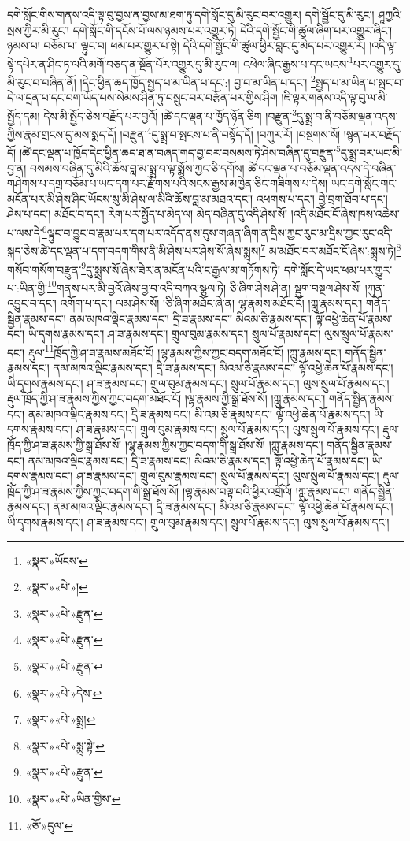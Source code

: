 དགེ་སློང་གིས་གནས་འདི་ལྟ་བུ་བྱས་ན་བྱས་མ་ཐག་ཏུ་དགེ་སློང་དུ་མི་རུང་བར་འགྱུར། དགེ་སྦྱོང་དུ་མི་རུང་། ཤཱཀྱའི་སྲས་ཀྱིར་མི་རུང་། དགེ་སློང་གི་དངོས་པོ་ལས་ཉམས་པར་འགྱུར་ཏེ། དེའི་དགེ་སྦྱོང་གི་ཚུལ་ཞིག་པར་འགྱུར་ཞིང་། ཉམས་པ། བཅོམ་པ། ལྟུང་བ། ཕམ་པར་གྱུར་པ་སྟེ། དེའི་དགེ་སྦྱོང་གི་ཚུལ་ཕྱིར་བླང་དུ་མེད་པར་འགྱུར་རོ། །འདི་ལྟ་སྟེ་དཔེར་ན་ཤིང་ཏ་ལའི་མགོ་བཅད་ན་སྔོན་པོར་འགྱུར་དུ་མི་རུང་ལ། འཕེལ་ཞིང་རྒྱས་པ་དང་ཡངས་\footnote{«སྣར་»ཡོངས་}པར་འགྱུར་དུ་མི་རུང་བ་བཞིན་ནོ། །དེང་ཕྱིན་ཆད་ཁྱོད་སྤྱད་པ་མ་ཡིན་པ་དང་:། བྱ་བ་མ་ཡིན་པ་དང་། \footnote{«སྣར་»«པེ་»།  }སྤྱད་པ་མ་ཡིན་པ་སྤང་བ་དེ་ལ་དྲན་པ་དང་བག་ཡོད་པས་སེམས་ཤིན་ཏུ་བསྲུང་བར་བརྩོན་པར་གྱིས་ཤིག །ཇི་ལྟར་གནས་འདི་ལྟ་བུ་ལ་མི་སྤྱོད་དམ། དེས་མི་སྤྱོད་ཅེས་བརྗོད་པར་བྱའོ། །ཚེ་དང་ལྡན་པ་ཁྱོད་ཉོན་ཅིག །བརྫུན་\footnote{«སྣར་»«པེ་»རྫུན་}དུ་སྨྲ་བ་ནི་བཅོམ་ལྡན་འདས་ཀྱིས་རྣམ་གྲངས་དུ་མས་སྨད་དོ། །བརྫུན་\footnote{«སྣར་»«པེ་»རྫུན་}དུ་སྨྲ་བ་སྤངས་པ་ནི་བསྟོད་དོ། །བཀུར་རོ། །བསྔགས་སོ། །སྙན་པར་བརྗོད་དོ། །ཚེ་དང་ལྡན་པ་ཁྱོད་དེང་ཕྱིན་ཆད་ཐ་ན་བཞད་གད་བྱ་བར་བསམས་ཏེ་ཤེས་བཞིན་དུ་བརྫུན་\footnote{«སྣར་»«པེ་»རྫུན་}དུ་སྨྲ་བར་ཡང་མི་བྱ་ན། བསམས་བཞིན་དུ་མིའི་ཆོས་བླ་མ་སྨྲ་བ་ལྟ་སྨོས་ཀྱང་ཅི་དགོས། ཚེ་དང་ལྡན་པ་བཅོམ་ལྡན་འདས་དེ་བཞིན་གཤེགས་པ་དགྲ་བཅོམ་པ་ཡང་དག་པར་རྫོགས་པའི་སངས་རྒྱས་མཁྱེན་ཅིང་གཟིགས་པ་དེས། ཡང་དགེ་སློང་གང་མངོན་པར་མི་ཤེས་ཤིང་ཡོངས་སུ་མི་ཤེས་ལ་མིའི་ཆོས་བླ་མ་མཐའ་དང་། འཕགས་པ་དང་། བྱེ་བྲག་ཐོབ་པ་དང་། ཤེས་པ་དང་། མཐོང་བ་དང་། རེག་པར་སྤྱོད་པ་མེད་ལ། མེད་བཞིན་དུ་འདི་ཤེས་སོ། །འདི་མཐོང་ངོ་ཞེས་ཁས་འཆེས་པ་ལས་དེ་\footnote{«སྣར་»«པེ་»དེས་}ལྟུང་བ་བྱུང་བ་རྣམ་པར་དག་པར་འདོད་ནས་དུས་གཞན་ཞིག་ན་དྲིས་ཀྱང་རུང་མ་དྲིས་ཀྱང་རུང་འདི་སྐད་ཅེས་ཚེ་དང་ལྡན་པ་དག་བདག་གིས་ནི་མི་ཤེས་པར་ཤེས་སོ་ཞེས་སྨྲས།\footnote{«སྣར་»«པེ་»སྨྲ།} མ་མཐོང་བར་མཐོང་ངོ་ཞེས་:སྨྲས་ཏེ།\footnote{«སྣར་»«པེ་»སྨྲ་སྟེ།} གསོབ་གསོག་བརྫུན་\footnote{«སྣར་»«པེ་»རྫུན་}དུ་སྨྲས་སོ་ཞེས་ཟེར་ན་མངོན་པའི་ང་རྒྱལ་མ་གཏོགས་ཏེ། དགེ་སློང་དེ་ཡང་ཕམ་པར་གྱུར་པ་:ཡིན་གྱི་\footnote{«སྣར་»«པེ་»ཡིན་གྱིས་}གནས་པར་མི་བྱའོ་ཞེས་བྱ་བ་འདི་བཀའ་སྩལ་ཏེ། ཅི་ཞིག་ཤེས་ཤེ་ན། སྡུག་བསྔལ་ཤེས་སོ། །ཀུན་འབྱུང་བ་དང་། འགོག་པ་དང་། ལམ་ཤེས་སོ། །ཅི་ཞིག་མཐོང་ཞེ་ན། ལྷ་རྣམས་མཐོང་ངོ། །ཀླུ་རྣམས་དང་། གནོད་སྦྱིན་རྣམས་དང་། ནམ་མཁའ་ལྡིང་རྣམས་དང་། དྲི་ཟ་རྣམས་དང་། མིའམ་ཅི་རྣམས་དང་། ལྟོ་འཕྱེ་ཆེན་པོ་རྣམས་དང་། ཡི་དྭགས་རྣམས་དང་། ཤ་ཟ་རྣམས་དང་། གྲུལ་བུམ་རྣམས་དང་། སྲུལ་པོ་རྣམས་དང་། ལུས་སྲུལ་པོ་རྣམས་དང་། རྡུལ་\footnote{«ཅོ་»དུལ་}ཁྲོད་ཀྱི་ཤ་ཟ་རྣམས་མཐོང་ངོ། །ལྷ་རྣམས་ཀྱིས་ཀྱང་བདག་མཐོང་ངོ། །ཀླུ་རྣམས་དང་། གནོད་སྦྱིན་རྣམས་དང་། ནམ་མཁའ་ལྡིང་རྣམས་དང་། དྲི་ཟ་རྣམས་དང་། མིའམ་ཅི་རྣམས་དང་། ལྟོ་འཕྱེ་ཆེན་པོ་རྣམས་དང་། ཡི་དྭགས་རྣམས་དང་། ཤ་ཟ་རྣམས་དང་། གྲུལ་བུམ་རྣམས་དང་། སྲུལ་པོ་རྣམས་དང་། ལུས་སྲུལ་པོ་རྣམས་དང་། རྡུལ་ཁྲོད་ཀྱི་ཤ་ཟ་རྣམས་ཀྱིས་ཀྱང་བདག་མཐོང་ངོ། །ལྷ་རྣམས་ཀྱི་སྒྲ་ཐོས་སོ། །ཀླུ་རྣམས་དང་། གནོད་སྦྱིན་རྣམས་དང་། ནམ་མཁའ་ལྡིང་རྣམས་དང་། དྲི་ཟ་རྣམས་དང་། མི་འམ་ཅི་རྣམས་དང་། ལྟོ་འཕྱེ་ཆེན་པོ་རྣམས་དང་། ཡི་དྭགས་རྣམས་དང་། ཤ་ཟ་རྣམས་དང་། གྲུལ་བུམ་རྣམས་དང་། སྲུལ་པོ་རྣམས་དང་། ལུས་སྲུལ་པོ་རྣམས་དང་། རྡུལ་ཁྲོད་ཀྱི་ཤ་ཟ་རྣམས་ཀྱི་སྒྲ་ཐོས་སོ། །ལྷ་རྣམས་ཀྱིས་ཀྱང་བདག་གི་སྒྲ་ཐོས་སོ། །ཀླུ་རྣམས་དང་། གནོད་སྦྱིན་རྣམས་དང་། ནམ་མཁའ་ལྡིང་རྣམས་དང་། དྲི་ཟ་རྣམས་དང་། མིའམ་ཅི་རྣམས་དང་། ལྟོ་འཕྱེ་ཆེན་པོ་རྣམས་དང་། ཡི་དྭགས་རྣམས་དང་། ཤ་ཟ་རྣམས་དང་། གྲུལ་བུམ་རྣམས་དང་། སྲུལ་པོ་རྣམས་དང་། ལུས་སྲུལ་པོ་རྣམས་དང་། རྡུལ་ཁྲོད་ཀྱི་ཤ་ཟ་རྣམས་ཀྱིས་ཀྱང་བདག་གི་སྒྲ་ཐོས་སོ། །ལྷ་རྣམས་བལྟ་བའི་ཕྱིར་འགྲོའོ། །ཀླུ་རྣམས་དང་། གནོད་སྦྱིན་རྣམས་དང་། ནམ་མཁའ་ལྡིང་རྣམས་དང་། དྲི་ཟ་རྣམས་དང་། མིའམ་ཅི་རྣམས་དང་། ལྟོ་འཕྱེ་ཆེན་པོ་རྣམས་དང་། ཡི་དྭགས་རྣམས་དང་། ཤ་ཟ་རྣམས་དང་། གྲུལ་བུམ་རྣམས་དང་། སྲུལ་པོ་རྣམས་དང་། ལུས་སྲུལ་པོ་རྣམས་དང་། 